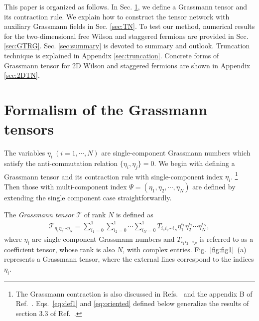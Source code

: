 \documentclass[a4paper,11pt]{article}
\begin{document}
This paper is organized as follows. In Sec. \ref{sec:formulation}, we define a Grassmann tensor and its contraction rule. We explain how to construct the tensor network with auxiliary Grassmann fields in Sec. \ref{sec:TN}. 
To test our method, 
numerical results for the two-dimensional free Wilson and staggered fermions
are provided in Sec. \ref{sec:GTRG}. Sec. \ref{sec:summary} is 
devoted to summary and outlook.
Truncation technique is explained in Appendix \ref{sec:truncation}. 
Concrete forms of Grassmann tensor for 2D Wilson and staggered fermions are shown in Appendix \ref{sec:2DTN}.



\section{Formalism of the Grassmann tensors}
\label{sec:formulation}

The variables $\eta_i \ (i=1,\cdots,N) $ are single-component Grassmann numbers which satisfy the anti-commutation relation $ \{\eta_{i},\eta_{j} \}=0 $. We begin with defining a Grassmann tensor and its contraction rule with single-component index $\eta_i$. 
\footnote{
The Grassmann contraction is also discussed in Refs.~\cite{Gu:2010yh,Gu:2013gba} and the appendix B of Ref.~\cite{Bao:2019hfc}.
Eqs.~\eqref{eq:def1} and \eqref{eq:oriented} defined below generalize the results of section $3.3$ of Ref.~\cite{Meurice:2018fky}.
}
Then those with multi-component index $\Psi=(\eta_1,\eta_2,\cdots,\eta_N)$ are defined by extending the single component case straightforwardly. 



The {\it Grassmann tensor} $\mathcal{T}$ of rank $N$ is defined as
\begin{align}
\label{eq:def1}
	\mathcal{T}_{\eta_{1}\eta_{2}\cdots\eta_{N}}=\sum_{i_{1}=0}^1 \sum_{i_{2}=0}^1 \cdots \sum_{i_{N}=0}^1 T_{i_{1}i_{2}\cdots i_{N}}\eta_{1}^{i_{1}}\eta_{2}^{i_{2}}\cdots\eta_{N}^{i_{N}},
\end{align}
where $\eta_i$ are single-component Grassmann numbers and $T_{i_{1}i_{2}\cdots i_{N}}$ is referred to as a coefficient tensor, whose rank is also $N$, with complex entries. Fig.~\ref{fig:fig1}~(a) represents a Grassmann tensor, where the external lines correspond to the indices $\eta_i$.  
\end{document}
